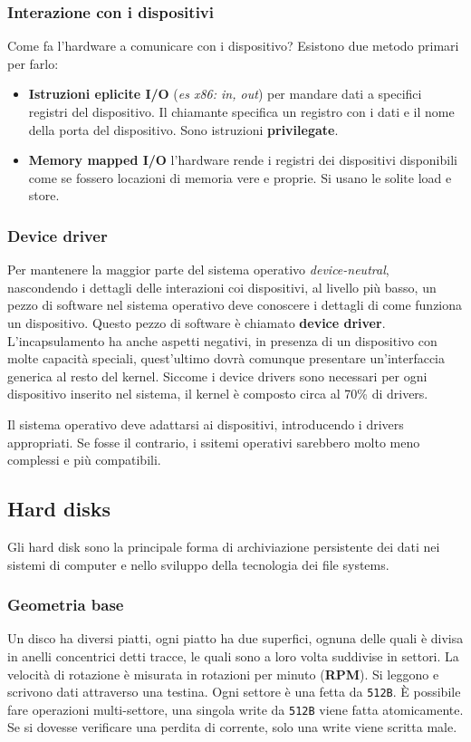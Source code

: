 \documentclass[12pt, letterpaper]{article}
\begin{document}
			\subsubsection{Interazione con i dispositivi}
				Come fa l'hardware a comunicare con i dispositivo? Esistono due metodo primari per farlo:
				\begin{itemize}
					\item \textbf{Istruzioni eplicite I/O} (\textit{es x86: in, out}) per mandare dati a specifici registri del dispositivo.  Il chiamante specifica un registro con i dati e il nome della porta del dispositivo. Sono istruzioni \textbf{privilegate}.
					\item \textbf{Memory mapped I/O} l'hardware rende i registri dei dispositivi disponibili come se fossero locazioni di memoria vere e proprie. Si usano le solite load e store.
				\end{itemize}
				
			\subsubsection{Device driver}
				Per mantenere la maggior parte del sistema operativo \textit{device-neutral}, nascondendo i dettagli delle interazioni coi dispositivi, al livello più basso, un pezzo di software nel sistema operativo deve conoscere i dettagli di come funziona un dispositivo. Questo pezzo di software è chiamato \textbf{device driver}. L'incapsulamento ha anche aspetti negativi, in presenza di un dispositivo con molte capacità speciali, quest'ultimo dovrà comunque presentare un'interfaccia generica al resto del kernel.
				Siccome i device drivers sono necessari per ogni dispositivo inserito nel sistema, il kernel è composto circa al 70\% di drivers.
				
				Il sistema operativo deve adattarsi ai dispositivi, introducendo i drivers appropriati. Se fosse il contrario, i ssitemi operativi sarebbero molto meno complessi e più compatibili.
				
		\subsection{Hard disks}
			Gli hard disk sono la principale forma di archiviazione persistente dei dati nei sistemi di computer e nello sviluppo della tecnologia dei file systems.
			
			\subsubsection{Geometria base}
				Un disco ha diversi piatti, ogni piatto ha due superfici, ognuna delle quali è divisa in anelli concentrici detti tracce, le quali sono a loro volta suddivise in settori. La velocità di rotazione è misurata in rotazioni per minuto (\textbf{RPM}). Si leggono e scrivono dati attraverso una testina.
				Ogni settore è una fetta da \texttt{512B}. È possibile fare operazioni multi-settore, una singola write da \texttt{512B} viene fatta atomicamente. Se si dovesse verificare una perdita di corrente, solo una write viene scritta male.
				
\end{document}
